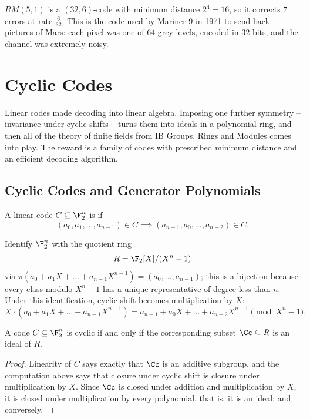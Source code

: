 \begin{example}
	$RM(5,1)$ is a $(32,6)$-code with minimum distance $2^4 = 16$, so it corrects $7$ errors at rate $\frac6{32}$. This is the code used by Mariner 9 in 1971 to send back pictures of Mars: each pixel was one of $64$ grey levels, encoded in $32$ bits, and the channel was extremely noisy.
\end{example}


\section{Cyclic Codes}\label{sec:cyclic}

Linear codes made decoding into linear algebra. Imposing one further symmetry -- invariance under cyclic shifts -- turns them into ideals in a polynomial ring, and then all of the theory of finite fields from IB Groups, Rings and Modules comes into play. The reward is a family of codes with prescribed minimum distance and an efficient decoding algorithm.

\subsection{Cyclic Codes and Generator Polynomials}

\begin{definition}
	A linear code $C \subseteq \F_2^n$ is  if
	$$(a_0,a_1,\dots,a_{n-1}) \in C \implies (a_{n-1},a_0,\dots,a_{n-2}) \in C.$$
\end{definition}

Identify $\F_2^n$ with the quotient ring
$$R = \F_2[X]/(X^n-1)$$
via $\pi(a_0+a_1X+\dots+a_{n-1}X^{n-1}) = (a_0,\dots,a_{n-1})$; this is a bijection because every class modulo $X^n - 1$ has a unique representative of degree less than $n$. Under this identification, cyclic shift becomes multiplication by $X$:
$$X\cdot(a_0+a_1X+\dots+a_{n-1}X^{n-1}) = a_{n-1}+a_0X+\dots+a_{n-2}X^{n-1} \pmod{X^n-1}.$$

\begin{lemma}
	A code $C \subseteq \F_2^n$ is cyclic if and only if the corresponding subset $\Cc \subseteq R$ is an ideal of $R$.
\end{lemma}

\begin{proof}
	Linearity of $C$ says exactly that $\Cc$ is an additive subgroup, and the computation above says that closure under cyclic shift is closure under multiplication by $X$. Since $\Cc$ is closed under addition and multiplication by $X$, it is closed under multiplication by every polynomial, that is, it is an ideal; and conversely.
\end{proof}

